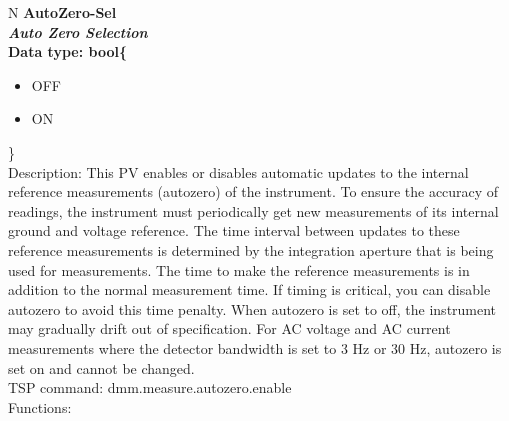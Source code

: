 \documentclass[openany]{article}
\begin{document}
		\begin{tabular}{N}
			\hline
			\bfseries AutoZero-Sel\label{pv:autozero-sel} \\ \hline
			\emph{Auto Zero Selection} \\
			Data type: bool\{\begin{itemize}[noitemsep]
				\small
				\item[] OFF
				\item[] ON
			\end{itemize}\} \\
			Description: This PV enables or disables automatic updates to the internal reference measurements (autozero) of the instrument. To ensure the accuracy of readings, the instrument must periodically get new measurements of its internal ground and voltage reference. The time interval between updates to these reference measurements is determined by the integration aperture that is being used for measurements. The time to make the reference measurements is in addition to the normal measurement time. If timing is critical, you can disable autozero to avoid this time penalty. When autozero is set to off, the instrument may gradually drift out of specification. For AC voltage and AC current measurements where the detector bandwidth is set to 3 Hz or 30 Hz, autozero is set on and cannot be changed. \\
			TSP command: dmm.measure.autozero.enable \\
			Functions: \\
			\arrayrulecolor{\FuncTableBorderColor}

		\end{tabular}
\end{document}
